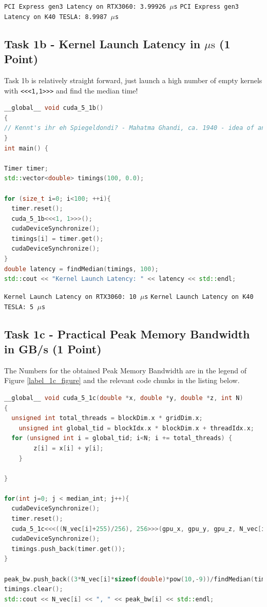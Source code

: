 \texttt{PCI Express gen3 Latency on RTX3060: 3.99926 $\mu$s} \newline
\texttt{PCI Express gen3 Latency on K40 TESLA: 8.9987 $\mu$s}

\pagebreak


\subsection{Task 1b - Kernel Launch Latency in $\mu \mathrm{s}$ (1 Point)}
Task 1b is relatively straight forward, just launch a high number of empty kernels with \texttt{<<<1,1>>>} and find the median time!

\begin{lstlisting}[language=C++, title=C++ Cuda Code for Kernel Launch Latency]
__global__ void cuda_5_1b()
{
// Kennt's ihr eh Spiegeldondi? - Mahatma Ghandi, ca. 1940 - idea of an empty Kernel..
}
int main() {

Timer timer;
std::vector<double> timings(100, 0.0);

for (size_t i=0; i<100; ++i){
  timer.reset();
  cuda_5_1b<<<1, 1>>>();
  cudaDeviceSynchronize();
  timings[i] = timer.get();
  cudaDeviceSynchronize();
}
double latency = findMedian(timings, 100);
std::cout << "Kernel Launch Latency: " << latency << std::endl;
\end{lstlisting}

\texttt{Kernel Launch Latency on RTX3060: 10 $\mu$s} \newline
\texttt{Kernel Launch Latency on K40 TESLA: 5 $\mu$s}



\pagebreak


\subsection{Task 1c - Practical Peak Memory Bandwidth in GB/s (1 Point)}
The Numbers for the obtained Peak Memory Bandwidth are in the legend of Figure \ref{label_1c_figure} and the relevant code chunks in the listing below.

\begin{lstlisting}[language=C++, title=C++ Cuda Code for Peak Memory Bandwidth]
__global__ void cuda_5_1c(double *x, double *y, double *z, int N)
{
  unsigned int total_threads = blockDim.x * gridDim.x;
	unsigned int global_tid = blockIdx.x * blockDim.x + threadIdx.x;
  for (unsigned int i = global_tid; i<N; i += total_threads) {
		z[i] = x[i] + y[i];
	}

}

for(int j=0; j < median_int; j++){
  cudaDeviceSynchronize();
  timer.reset();
  cuda_5_1c<<<((N_vec[i]+255)/256), 256>>>(gpu_x, gpu_y, gpu_z, N_vec[i]);
  cudaDeviceSynchronize();
  timings.push_back(timer.get());
}

peak_bw.push_back((3*N_vec[i]*sizeof(double)*pow(10,-9))/findMedian(timings, median_int));
timings.clear();
std::cout << N_vec[i] << ", " << peak_bw[i] << std::endl;
\end{lstlisting}

